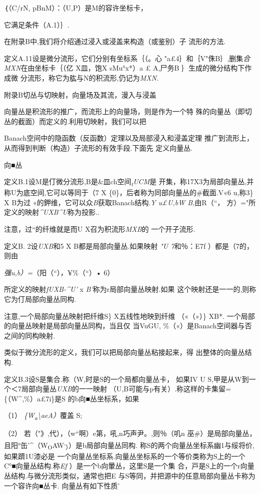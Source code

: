 ｛（C/r\textbar{}N, pBnM）：（U,P）是M的容许坐标卡，

它满足条件（A.1）｝. \textbar{}

在附录B中,我们将介绍通过浸入或浸盖来构造（或鉴别）子 流形的方法.

定义A.11设是微分流形，它们分别有坐标系｛（。心
"\textbar{}a£4｝和｛V"侏B｝,删集\emph{合MXN}在由坐标卡｛（亿 X皿，饱X
sMu°x*）\textbar{}a £ A,尸务B ｝生成的微分结构下作成微
分流形，称它为肱与N的积流形,仍记为\emph{MXN.}

附录B切丛与切映射，向量场及其流，漫入与浸盖

向量丛是积流形的推广，而流形上的向量场，则是作为一个特
殊的向量丛（即切丛的截面）而定义的.利用切映射，我们可以把

Banach空间中的隐函数（反函数）定理以及局部浸入和浸盖定理
推广到流形上，从而得到判断（构造）子流形的有效手段.下面先 定义向量丛.

向■丛

定义B.1设M是仃微分流形,B是\&皿ch空间\emph{\textsubscript{t}UCM}是
开集，称17X3为局部向量丛,并称U为底空间,它可以等同于（7 X
\{0\}，后者称为同部向量丛的\#截面.V«6 u,称3\} X B为过
«的鉀维，它可以众\emph{B}获取Banach结构.\emph{Y u£U,bW B,}由R（``，
方）="所定义的映射\emph{\^{}UXB\^{}U}称为投影..

注意，过``的纤维就是而U X召为积流形\emph{MXB}的 一个开子流形.

定义B. 2设\emph{UXB}和5 X B都是局部向量丛.如果映射 \emph{"U 7}和％：E7f
）都是（7的，则由

\emph{强u,b）=}（阳（``），¥\%（``）• 6）

所定义的映射\emph{fUXB-\^{}U'} x \emph{B'}称为r局部向量丛映射.如果
这个映射还是一一的,则称它为仃局部向量丛同构.

注意,一个局部向量丛映射把纤维S\} X五线性地映到纤维 （«（»）\} XB*.
一个局部的向量丛映射是局部向量丛同构，当且仅 当VuGU,
\%（«）是Banach空间器与否之间的同构映射.

类似于微分流形的定义，我们可以把局部向量丛粘接起来，得
出整体的向量丛结构.

定义B.3设S是集合.称（W,时是S的一个局都向量丛卡， 如果IV U
S,甲是从W到一个＜7局部向量丛\emph{UXB}的一一映射
（U,B可能与p有关）.称这样的卡集留=\{（W\^{},\%）\textbar{}a£7i\}是S
的b向■丛坐标系，如果

（1） \emph{\{W\textsubscript{a}\textbackslash{}aeA）}覆盖 S;

（2） 若（"》,代），（w``啊）e第，吼,n巧声尹。,则％（叽n
巫\#）是局部向量丛，且阳°缶'\^{}（W\textsubscript{O}AW\textsuperscript{,}\textsubscript{\textbar{}）}）是b局部向量丛同构.
称S的两个向量丛坐标系幽1与绥将价,如果躋1U漆必是
一个向量丛坐标系.向量丛坐标系的一个等价类称为S上的一个
C°■向量丛结构.称\emph{Ef} ）是一个b向暈丛，这里S是一个集
合，戸是S上的一个r向量丛结构.与微分流形类似，通常也把E
与S等同，并把源中的任意局部向量丛卡称为一个容许向■丛卡.
向量丛有如下性质'

